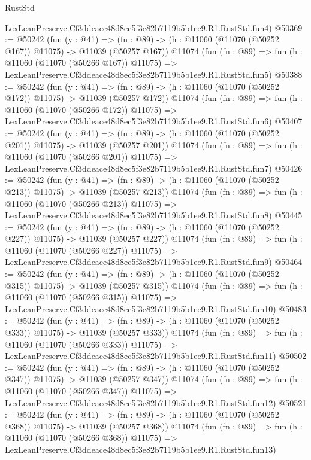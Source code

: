 \begin{lexlean}{RustStd}
\begin{coremodule}
    LexLeanPreserve.Cf3ddeace48d8ec5f3e82b7119b5b1ee9.R1.RustStd.fun4)
@50369 := @50242
    (fun (y : @41) =>
    (fn : @89) -> (h : @11060 (@11070 (@50252 @167)) @11075) -> @11039 (@50257 @167))
    @11074
    (fun (fn : @89) =>
    fun (h : @11060 (@11070 (@50266 @167)) @11075) =>
    LexLeanPreserve.Cf3ddeace48d8ec5f3e82b7119b5b1ee9.R1.RustStd.fun5)
@50388 := @50242
    (fun (y : @41) =>
    (fn : @89) -> (h : @11060 (@11070 (@50252 @172)) @11075) -> @11039 (@50257 @172))
    @11074
    (fun (fn : @89) =>
    fun (h : @11060 (@11070 (@50266 @172)) @11075) =>
    LexLeanPreserve.Cf3ddeace48d8ec5f3e82b7119b5b1ee9.R1.RustStd.fun6)
@50407 := @50242
    (fun (y : @41) =>
    (fn : @89) -> (h : @11060 (@11070 (@50252 @201)) @11075) -> @11039 (@50257 @201))
    @11074
    (fun (fn : @89) =>
    fun (h : @11060 (@11070 (@50266 @201)) @11075) =>
    LexLeanPreserve.Cf3ddeace48d8ec5f3e82b7119b5b1ee9.R1.RustStd.fun7)
@50426 := @50242
    (fun (y : @41) =>
    (fn : @89) -> (h : @11060 (@11070 (@50252 @213)) @11075) -> @11039 (@50257 @213))
    @11074
    (fun (fn : @89) =>
    fun (h : @11060 (@11070 (@50266 @213)) @11075) =>
    LexLeanPreserve.Cf3ddeace48d8ec5f3e82b7119b5b1ee9.R1.RustStd.fun8)
@50445 := @50242
    (fun (y : @41) =>
    (fn : @89) -> (h : @11060 (@11070 (@50252 @227)) @11075) -> @11039 (@50257 @227))
    @11074
    (fun (fn : @89) =>
    fun (h : @11060 (@11070 (@50266 @227)) @11075) =>
    LexLeanPreserve.Cf3ddeace48d8ec5f3e82b7119b5b1ee9.R1.RustStd.fun9)
@50464 := @50242
    (fun (y : @41) =>
    (fn : @89) -> (h : @11060 (@11070 (@50252 @315)) @11075) -> @11039 (@50257 @315))
    @11074
    (fun (fn : @89) =>
    fun (h : @11060 (@11070 (@50266 @315)) @11075) =>
    LexLeanPreserve.Cf3ddeace48d8ec5f3e82b7119b5b1ee9.R1.RustStd.fun10)
@50483 := @50242
    (fun (y : @41) =>
    (fn : @89) -> (h : @11060 (@11070 (@50252 @333)) @11075) -> @11039 (@50257 @333))
    @11074
    (fun (fn : @89) =>
    fun (h : @11060 (@11070 (@50266 @333)) @11075) =>
    LexLeanPreserve.Cf3ddeace48d8ec5f3e82b7119b5b1ee9.R1.RustStd.fun11)
@50502 := @50242
    (fun (y : @41) =>
    (fn : @89) -> (h : @11060 (@11070 (@50252 @347)) @11075) -> @11039 (@50257 @347))
    @11074
    (fun (fn : @89) =>
    fun (h : @11060 (@11070 (@50266 @347)) @11075) =>
    LexLeanPreserve.Cf3ddeace48d8ec5f3e82b7119b5b1ee9.R1.RustStd.fun12)
@50521 := @50242
    (fun (y : @41) =>
    (fn : @89) -> (h : @11060 (@11070 (@50252 @368)) @11075) -> @11039 (@50257 @368))
    @11074
    (fun (fn : @89) =>
    fun (h : @11060 (@11070 (@50266 @368)) @11075) =>
    LexLeanPreserve.Cf3ddeace48d8ec5f3e82b7119b5b1ee9.R1.RustStd.fun13)

\end{coremodule}
\end{lexlean}
